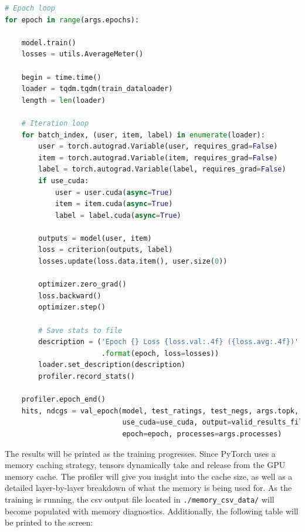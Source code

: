 \documentclass[12pt,letterpaper]{article}
\begin{document}
\begin{lstlisting}[language=Python]
# Epoch loop
for epoch in range(args.epochs):

    model.train()
    losses = utils.AverageMeter()

    begin = time.time()
    loader = tqdm.tqdm(train_dataloader)
    length = len(loader)
    
    # Iteration loop
    for batch_index, (user, item, label) in enumerate(loader):
        user = torch.autograd.Variable(user, requires_grad=False)
        item = torch.autograd.Variable(item, requires_grad=False)
        label = torch.autograd.Variable(label, requires_grad=False)
        if use_cuda:
            user = user.cuda(async=True)
            item = item.cuda(async=True)
            label = label.cuda(async=True)

        outputs = model(user, item)
        loss = criterion(outputs, label)
        losses.update(loss.data.item(), user.size(0))

        optimizer.zero_grad()
        loss.backward()
        optimizer.step()

        # Save stats to file
        description = ('Epoch {} Loss {loss.val:.4f} ({loss.avg:.4f})'
                       .format(epoch, loss=losses))
        loader.set_description(description)
        profiler.record_stats()

    profiler.epoch_end()
    hits, ndcgs = val_epoch(model, test_ratings, test_negs, args.topk,
                            use_cuda=use_cuda, output=valid_results_file,
                            epoch=epoch, processes=args.processes)
\end{lstlisting}
The results will be printed as the training progresses. Since PyTorch uses a memory caching strategy, tensors dynamically take and release from the GPU memory cache. The profiler will give you insight into the cache size, as well as a detailed layer-by-layer breakdown of what the memory is being used for. As the training is running, the csv output file located in \texttt{./memory\_csv\_data/} will become populated with memory diagnostics. Additionally, the following table will be printed to the screen:
\end{document}
